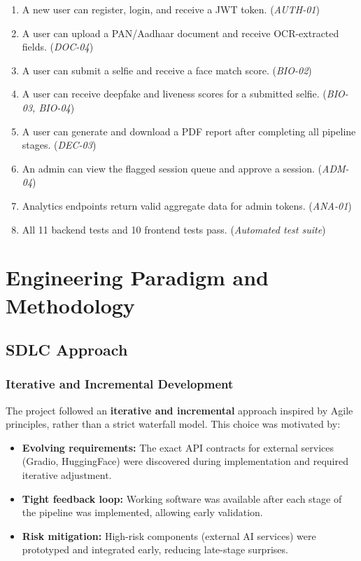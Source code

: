 \documentclass[12pt,a4paper]{report}
\begin{document}
\begin{enumerate}
    \item A new user can register, login, and receive a JWT token. (\textit{AUTH-01})
    \item A user can upload a PAN/Aadhaar document and receive OCR-extracted fields. (\textit{DOC-04})
    \item A user can submit a selfie and receive a face match score. (\textit{BIO-02})
    \item A user can receive deepfake and liveness scores for a submitted selfie. (\textit{BIO-03, BIO-04})
    \item A user can generate and download a PDF report after completing all pipeline stages. (\textit{DEC-03})
    \item An admin can view the flagged session queue and approve a session. (\textit{ADM-04})
    \item Analytics endpoints return valid aggregate data for admin tokens. (\textit{ANA-01})
    \item All 11 backend tests and 10 frontend tests pass. (\textit{Automated test suite})
\end{enumerate}

\chapter{Engineering Paradigm and Methodology}

\section{SDLC Approach}

\subsection{Iterative and Incremental Development}

The project followed an \textbf{iterative and incremental} approach inspired by Agile principles, rather than a strict waterfall model. This choice was motivated by:

\begin{itemize}
    \item \textbf{Evolving requirements:} The exact API contracts for external services (Gradio, HuggingFace) were discovered during implementation and required iterative adjustment.
    \item \textbf{Tight feedback loop:} Working software was available after each stage of the pipeline was implemented, allowing early validation.
    \item \textbf{Risk mitigation:} High-risk components (external AI services) were prototyped and integrated early, reducing late-stage surprises.
\end{itemize}
\end{document}
